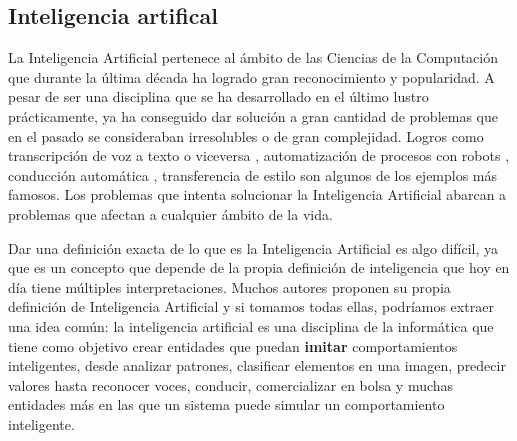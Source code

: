 \subsection{Inteligencia artifical}

La Inteligencia Artificial pertenece al ámbito de las Ciencias de la Computación que durante la última década ha logrado gran reconocimiento y popularidad. A pesar de ser una disciplina que se ha desarrollado en el último lustro prácticamente, ya ha conseguido dar solución a gran cantidad de problemas que en el pasado se consideraban irresolubles o de gran complejidad. Logros como transcripción de voz a texto \cite{voice2text} o viceversa \cite{text2voice}, automatización de procesos con robots \cite{robots}, conducción automática \cite{automaticdriving}, transferencia de estilo \cite{styletransfer} son algunos de los ejemplos más famosos. Los problemas que intenta solucionar la Inteligencia Artificial abarcan a problemas que afectan a cualquier ámbito de la vida.
\newline

Dar una definición exacta de lo que es la Inteligencia Artificial es algo difícil, ya que es un concepto que depende de la propia definición de inteligencia que hoy en día tiene múltiples interpretaciones. Muchos autores proponen su propia definición de Inteligencia Artificial \cite{haugeland, bellman, charniak, winston, kurzweil, knight, nilsson} y si tomamos todas ellas, podríamos extraer una idea común: la inteligencia artificial es una disciplina de la informática que tiene como objetivo crear entidades que puedan \textbf{imitar} comportamientos inteligentes, desde analizar patrones, clasificar elementos en una imagen, predecir valores hasta reconocer voces, conducir, comercializar en bolsa y muchas entidades más en las que un sistema puede simular un comportamiento inteligente. 
\newline


